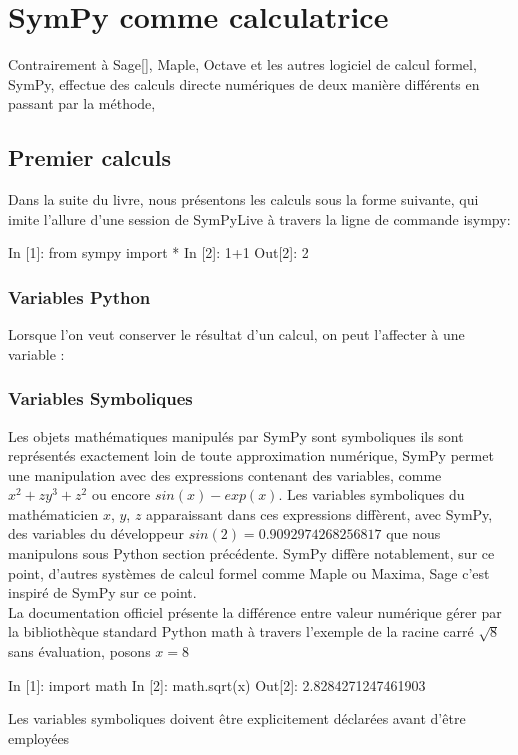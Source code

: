\section{SymPy comme calculatrice}
Contrairement à Sage[], Maple, Octave et les autres logiciel de calcul formel, SymPy, effectue des calculs directe numériques de deux manière différents en passant par la méthode, 
\subsection{Premier calculs}
Dans la suite du livre, nous présentons les calculs sous la forme suivante, qui
imite l’allure d’une session de SymPyLive à travers la ligne de commande isympy:
\begin{python}
In [1]: from sympy import *
In [2]: 1+1                                                                     
Out[2]: 2
\end{python}
\subsubsection{Variables Python}
Lorsque l’on veut conserver le résultat d’un calcul, on peut l’affecter à une
variable :

\subsubsection{Variables Symboliques}
Les objets mathématiques manipulés par SymPy sont symboliques ils sont représentés exactement loin de 
toute approximation numérique, SymPy permet une manipulation avec des expressions contenant
des variables, comme $x^{2} + zy^{3} + z^{2}$ ou encore $sin(x) - exp(x)$. Les variables symboliques
du mathématicien $x$, $y$, $z$ apparaissant dans ces expressions diffèrent, avec SymPy,
des variables du développeur $sin(2) = 0.9092974268256817$ que nous manipulons sous Python 
section précédente. SymPy diffère notablement, sur ce point, d’autres systèmes de calcul
formel comme Maple ou Maxima, Sage c'est inspiré de SymPy sur ce point.
\\

La documentation officiel présente la différence entre valeur numérique gérer par la bibliothèque
standard Python math à travers l'exemple de la racine carré $\sqrt{8}$ sans évaluation,
posons $x=8$

\begin{python}
In [1]: import math                                                             
In [2]: math.sqrt(x)                                                            
Out[2]: 2.8284271247461903
\end{python}
Les variables symboliques doivent \^etre explicitement déclarées avant d'\^etre employées

